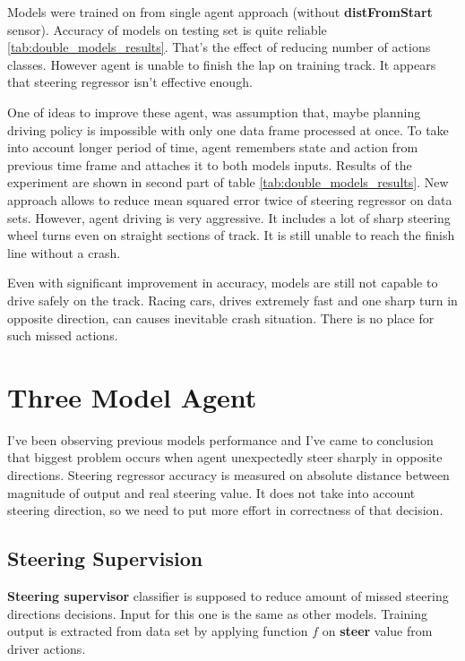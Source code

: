 \documentclass[declaration,shortabstract,english,inz]{iithesis}
\begin{document}
Models were trained on from single agent approach (without \textbf{distFromStart} sensor).
Accuracy of models on testing set is quite reliable \ref{tab:double_models_results}.
That's the effect of reducing number of actions classes.
However agent is unable to finish the lap on training track.
It appears that steering regressor isn't effective enough.


One of ideas to improve these agent, was assumption that, maybe planning driving policy is impossible with only one data frame processed at once.
To take into account longer period of time, agent remembers state and action from previous time frame and attaches it to both models inputs.
Results of the experiment are shown in second part of table \ref{tab:double_models_results}.
New approach allows to reduce mean squared error twice of steering regressor on data sets.
However, agent driving is very aggressive.
It includes a lot of sharp steering wheel turns even on straight sections of track.
It is still unable to reach the finish line without a crash.

Even with significant improvement in accuracy, models are still not capable to drive safely on the track.
Racing cars, drives extremely fast and one sharp turn in opposite direction, can causes inevitable crash situation.
There is no place for such missed actions.
 

\section{Three Model Agent}

I've been observing previous models performance and I've came to conclusion that biggest problem occurs when agent unexpectedly steer sharply in opposite directions.
Steering regressor accuracy is measured on absolute distance between magnitude of output and real steering value.
It does not take into account steering direction, so we need to put more effort in correctness of that decision.

\subsection{Steering Supervision}


\textbf{Steering supervisor} classifier is supposed to reduce amount of missed steering directions decisions.
Input for this one is the same as other models.
Training output is extracted from data set by applying function $f$ on \textbf{steer} value from driver actions.
\end{document}
